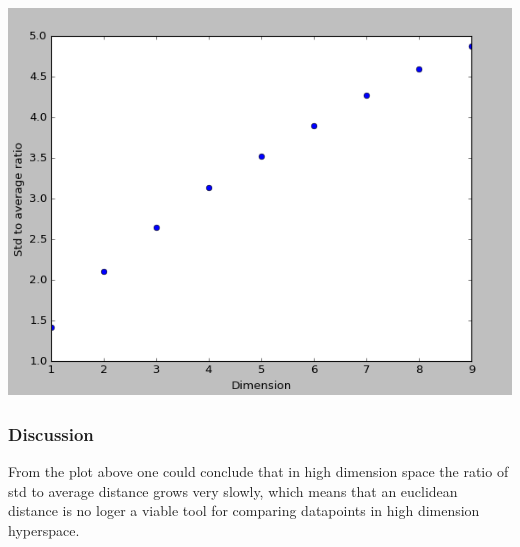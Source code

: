 \documentclass{article}
\begin{document}
\includegraphics[width=\textwidth]{std_to_average_ratio}

\subsubsection{Discussion}

From the plot above one could conclude that in high dimension space the ratio of std to average distance grows very slowly,
which means that an euclidean distance is no loger a viable tool for comparing datapoints in high dimension hyperspace.
\end{document}
